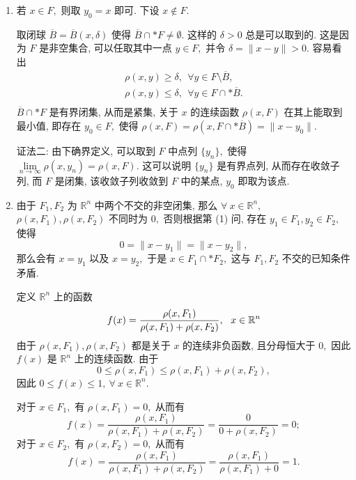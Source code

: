 \begin{solution}
\begin{enumerate}
\item 若 $x \in F,$ 则取 $y_0 = x$ 即可. 下设 $x \not\in F$.

取闭球 $\overline{B} = \overline{B}(x, \delta)$ 使得 $\overline{B} \cap* F \neq \emptyset.$ 这样的 $\delta > 0$ 总是可以取到的. 这是因为 $F$ 是非空集合, 可以任取其中一点 $y \in F,$ 并令 $\delta = \lVert x - y \rVert > 0.$ 容易看出
\begin{equation*}
\begin{gathered}
\rho(x, y) \geqslant \delta, ~~ \forall y \in F \setminus \overline{B}, \\
\rho(x, y) \leqslant \delta, ~~ \forall y \in F \cap* \overline{B}. \\
\end{gathered}
\end{equation*}
$\overline{B} \cap* F$ 是有界闭集, 从而是紧集, 关于 $x$ 的连续函数 $\rho(x, F)$ 在其上能取到最小值, 即存在 $y_0 \in F,$ 使得 $\rho(x, F) = \rho(x, F \cap* \overline{B}) = \lVert x - y_0 \rVert.$ 

证法二: 由下确界定义, 可以取到 $F$ 中点列 $\{y_n\},$ 使得 $\lim\limits_{n\to\infty} \rho(x, y_n) = \rho(x, F).$ 这可以说明 $\{y_n\}$ 是有界点列, 从而存在收敛子列, 而 $F$ 是闭集, 该收敛子列收敛到 $F$ 中的某点, $y_0$ 即取为该点.

\item 由于 $F_1, F_2$ 为 $\mathbb{R}^n$ 中两个不交的非空闭集, 那么 $\forall ~ x \in \mathbb{R}^n,$ $\rho(x, F_1), \rho(x, F_2)$ 不同时为 $0,$ 否则根据第 (1) 问, 存在 $y_1 \in F_1, y_2 \in F_2,$ 使得
$$0 = \lVert x - y_1 \rVert = \lVert x - y_2 \rVert,$$
那么会有 $x = y_1$ 以及 $x = y_2,$ 于是 $x \in F_1 \cap* F_2,$ 这与 $F_1, F_2$ 不交的已知条件矛盾.

定义 $\mathbb{R}^n$ 上的函数
\begin{equation*}
f(x) = \dfrac{\rho(x, F_1)}{\rho(x, F_1) + \rho(x, F_2)}, ~~ x \in \mathbb{R}^n \score{5}
\end{equation*}
由于 $\rho(x, F_1), \rho(x, F_2)$ 都是关于 $x$ 的连续非负函数, 且分母恒大于 $0,$ 因此$f(x)$ 是 $\mathbb{R}^n$ 上的连续函数. 由于
$$0 \leqslant \rho(x, F_1) \leqslant \rho(x, F_1) + \rho(x, F_2),$$
因此 $0 \leqslant f(x) \leqslant 1, ~ \forall ~ x \in \mathbb{R}^n.$

对于 $x \in F_1,$ 有 $\rho(x, F_1) = 0,$ 从而有
$$f(x) = \dfrac{\rho(x, F_1)}{\rho(x, F_1) + \rho(x, F_2)} = \dfrac{0}{0 + \rho(x, F_2)} = 0;$$
对于 $x \in F_2,$ 有 $\rho(x, F_2) = 0,$ 从而有
$$f(x) = \dfrac{\rho(x, F_1)}{\rho(x, F_1) + \rho(x, F_2)} = \dfrac{\rho(x, F_1)}{\rho(x, F_1) + 0} = 1.$$


\end{enumerate}
\end{solution}
